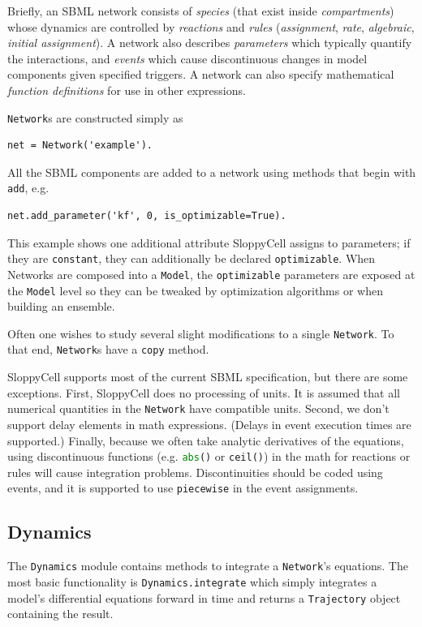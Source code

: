 \documentclass[12pt]{article}
\makeatletter
\newcommand{\py}[1]{\lstinline[language=Python, showstringspaces=False]@#1@}
\makeatother
\begin{document}
Briefly, an SBML network consists of \emph{species} (that exist inside \emph{compartments}) whose dynamics are controlled by \emph{reactions} and \emph{rules} (\emph{assignment}, \emph{rate}, \emph{algebraic}, \emph{initial assignment}).
A network also describes \emph{parameters} which typically quantify the interactions, and \emph{events} which cause discontinuous changes in model components given specified triggers.
A network can also specify mathematical \emph{function definitions} for use in other expressions.

\py{Network}s are constructed simply as
\begin{lstlisting}
net = Network('example').
\end{lstlisting}
All the SBML components are added to a network using methods that begin with \py{add}, e.g.
\begin{lstlisting}
net.add_parameter('kf', 0, is_optimizable=True).
\end{lstlisting}
This example shows one additional attribute SloppyCell assigns to parameters; if they are \py{constant}, they can additionally be declared \py{optimizable}.
When Networks are composed into a \py{Model}, the \py{optimizable} parameters are exposed at the \py{Model} level so they can be tweaked by optimization algorithms or when building an ensemble.

Often one wishes to study several slight modifications to a single \py{Network}.
To that end, \py{Network}s have a \py{copy} method.

SloppyCell supports most of the current SBML specification, but there are some exceptions.
First, SloppyCell does no processing of units. It is assumed that all numerical quantities in the \py{Network} have compatible units.
Second, we don't support delay elements in math expressions.
(Delays in event execution times are supported.)
Finally, because we often take analytic derivatives of the equations, using discontinuous functions (e.g. \py{abs()} or \py{ceil()}) in the math for reactions or rules will cause integration problems.
Discontinuities should be coded using events, and it is supported to use \py{piecewise} in the event assignments.

\subsection{Dynamics}
The \py{Dynamics} module contains methods to integrate a \py{Network}'s equations.
The most basic functionality is \py{Dynamics.integrate} which simply integrates a model's differential equations forward in time and returns a \py{Trajectory} object containing the result.
\end{document}
